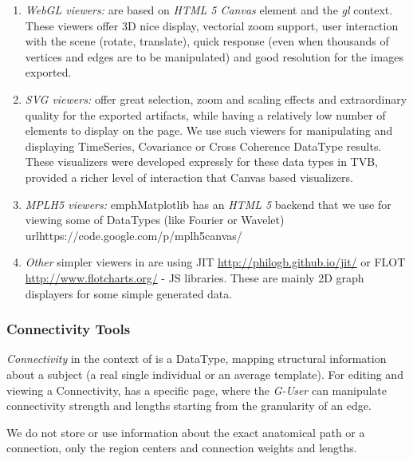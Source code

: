 	\begin{enumerate}
		\item \emph{WebGL viewers:} are based on \emph{HTML 5 Canvas} element
		and the \emph{gl} context. These viewers offer 3D nice display,
		vectorial zoom support, user interaction with the scene (rotate,
		translate), quick response (even when thousands of vertices and edges
		are to be manipulated) and good resolution for the images exported.
		
		\item \emph{SVG viewers:} offer great selection, zoom and scaling
		effects and extraordinary quality for the exported artifacts, while
		having a relatively low number of elements to display on the page. We
		use such viewers for manipulating and displaying TimeSeries,
		Covariance or Cross Coherence DataType results. These visualizers
		were developed expressly for these data types in TVB, provided a 
		richer level of interaction that Canvas based visualizers.

		\item \emph{MPLH5 viewers:}  emph{Matplotlib} has an \emph{HTML 5}
		backend that we use for viewing some of \TVB DataTypes (like
		Fourier or Wavelet) url{https://code.google.com/p/mplh5canvas/}

		\item \emph{Other} simpler viewers in \TVB are using JIT
		\url{http://philogb.github.io/jit/} or FLOT
		\url{http://www.flotcharts.org/} - JS libraries. These are mainly
		2D graph displayers for some simple \TVB generated data.
	\end{enumerate}

\subsubsection{Connectivity Tools}

		\emph{Connectivity} in the context of \TVB is a DataType, mapping structural
		information about a subject (a real single individual or an average template). For
		editing and viewing a Connectivity, \TVB has a specific page, where
		the \emph{G-User} can manipulate connectivity strength and lengths
		starting from the granularity of an edge.

		We do not store or use information about the exact anatomical path or
		a connection, only the region centers and connection weights and
		lengths.

